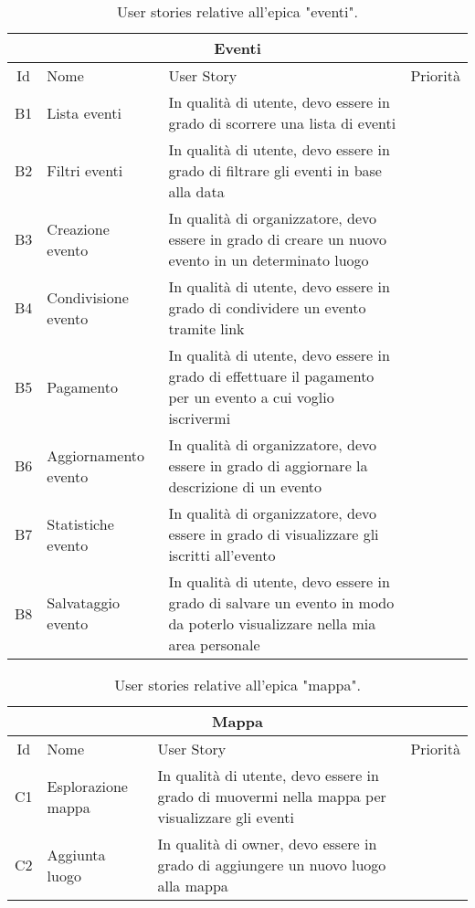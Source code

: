 \documentclass[9pt]{extarticle}
\begin{document}
\begin{table}[!htb]
	\centering
	\begin{tabular}{clp{7cm}l} %
		\toprule
		\multicolumn{4}{c}{\textbf{Eventi}}\\ \midrule
		Id & Nome & User Story & Priorità \\ \midrule
		B1  & Lista eventi            & In qualità di utente, devo essere in grado di scorrere una lista di eventi                                               &  \\
		B2  & Filtri eventi           & In qualità di utente, devo essere in grado di filtrare gli eventi in base alla data                                      &  \\
		B3  & Creazione evento        & In qualità di organizzatore, devo essere in grado di creare un nuovo evento in un determinato luogo                      &  \\
		B4  & Condivisione evento     & In qualità di utente, devo essere in grado di condividere un evento tramite link                                         &  \\
		B5  & Pagamento               & In qualità di utente, devo essere in grado di effettuare il pagamento per un evento a cui voglio iscrivermi              & \\
		B6  & Aggiornamento evento    & In qualità di organizzatore, devo essere in grado di aggiornare la descrizione di un evento                              & \\
		B7  & Statistiche evento      & In qualità di organizzatore, devo essere in grado di visualizzare gli iscritti all'evento                                & \\
		B8  & Salvataggio evento      & In qualità di utente, devo essere in grado di salvare un evento in modo da poterlo visualizzare nella mia area personale & \\
		\bottomrule
	\end{tabular}
	\caption{User stories relative all'epica "eventi".}
	\label{tab:eventi}
\end{table}


\begin{table}[!htb]
	\centering
	\begin{tabular}{clp{7cm}l} %
		\toprule
		\multicolumn{4}{c}{\textbf{Mappa}}\\ \midrule
		Id & Nome & User Story & Priorità \\ \midrule
		C1  & Esplorazione mappa      & In qualità di utente, devo essere in grado di muovermi nella mappa per visualizzare gli eventi                           &  \\
		C2  & Aggiunta luogo          & In qualità di owner, devo essere in grado di aggiungere un nuovo luogo alla mappa                                        & \\
		\bottomrule
	\end{tabular}
	\caption{User stories relative all'epica "mappa".}
	\label{tab:mappa}
\end{table}

	
\end{document}
